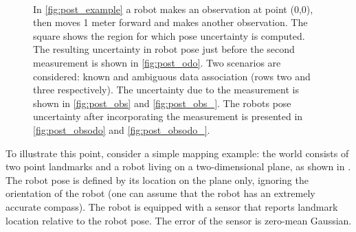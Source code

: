 \begin{figure}
\begin{center}
{\label{fig:post_obsodo}
}\\
\quad\space
{}
\end{center}
\caption[The robot pose uncertainty, example]{In \ref{fig:post_example} a
  robot makes an observation at point (0,0), then moves 1 meter
  forward and makes another observation. The square shows the region
  for which pose uncertainty is computed. The resulting uncertainty
  in robot pose just before the second measurement is shown in
  \ref{fig:post_odo}. Two scenarios are considered: known and
  ambiguous data association (rows two and three respectively).  The
  uncertainty due to the measurement is shown in \ref{fig:post_obs}
  and \ref{fig:post_obs_}. The robots pose uncertainty after
  incorporating the measurement is presented in \ref{fig:post_obsodo}
  and \ref{fig:post_obsodo_}.}\label{fig:post_all}
\end{figure}

To illustrate this point, consider a simple mapping example: the world
consists of two point landmarks and a robot living on a
two-dimensional plane, as shown in . The robot
pose is defined by its location on the plane only, ignoring the
orientation of the robot (one can assume that the robot has an
extremely accurate compass). The robot is equipped with a sensor that
reports landmark location relative to the robot pose. The error of the
sensor is zero-mean Gaussian.


